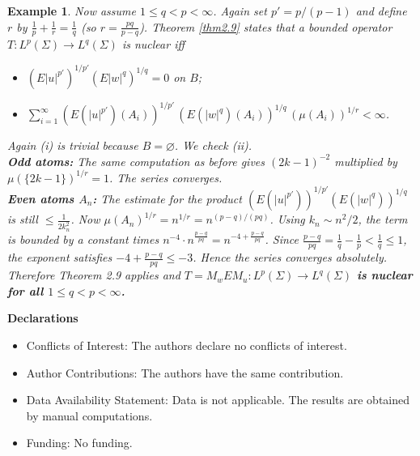 \documentclass{amsart}
\newtheorem{exam}[thm]{Example}
\theoremstyle{definition}\newtheorem{defn}[thm]{Definition}
\theoremstyle{remark}
\numberwithin{equation}{section}
\begin{document}
\begin{exam}
	Now assume $1\le q<p<\infty$. Again set $p' = p/(p-1)$ and define $r$ by $\frac1p+\frac1r=\frac1q$ (so $r=\frac{pq}{p-q}$).  
	Theorem \ref{thm2.9} states that a bounded operator $T : L^p(\Sigma) \to L^q(\Sigma)$ is nuclear iff  
	\begin{itemize}
		\item[(i)] $(E|u|^{p'})^{1/p'}(E|w|^{q})^{1/q}=0$ on $B$;
		\item[(ii)] $\sum_{i=1}^{\infty} (E(|u|^{p'})(A_i))^{1/p'}\,
		(E(|w|^q)(A_i))^{1/q}\,
		(\mu(A_i))^{1/r}<\infty$.
	\end{itemize}
	Again (i) is trivial because $B=\varnothing$.  
	We check (ii).\\
	\textbf{Odd atoms:} The same computation as before gives $(2k-1)^{-2}$ multiplied by $\mu(\{2k-1\})^{1/r}=1$. The series converges.\\
	\textbf{Even atoms $A_n$:} The estimate for the product $(E(|u|^{p'}))^{1/p'}(E(|w|^q))^{1/q}$ is still $\le \frac{1}{2k_n^{2}}$.  
	Now $\mu(A_n)^{1/r}=n^{1/r}=n^{(p-q)/(pq)}$.  
	Using $k_n\sim n^{2}/2$, the term is bounded by a constant times $n^{-4}\cdot n^{\frac{p-q}{pq}}=n^{-4+\frac{p-q}{pq}}$.  
	Since $\frac{p-q}{pq} = \frac1q-\frac1p < \frac1q \le 1$, the exponent satisfies $-4+\frac{p-q}{pq}\le -3$. Hence the series converges absolutely.  
	Therefore Theorem 2.9 applies and \textbf{$T = M_w E M_u : L^p(\Sigma) \to L^q(\Sigma)$ is nuclear for all $1\le q<p<\infty$.}
	
\end{exam}
{\bf Declarations}
\begin{itemize}
\item Conflicts of Interest:
The authors declare no conflicts of interest.
\item Author Contributions:
The authors have the same contribution.
\item Data Availability Statement:
Data is not applicable. The results are obtained by manual computations.
\item Funding:
No funding.
\end{itemize}
\end{document}
